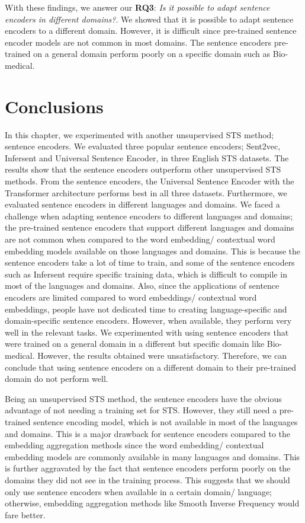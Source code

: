 With these findings, we answer our \textbf{RQ3}: \textit{Is it possible to adapt sentence encoders in different domains?}. We showed that it is possible to adapt sentence encoders to a different domain. However, it is difficult since pre-trained sentence encoder models are not common in most domains. The sentence encoders pre-trained on a general domain perform poorly on a specific domain such as Bio-medical. 

\section{Conclusions}
\label{sec:sentence_conclusions}
In this chapter, we experimented with another unsupervised STS method; sentence encoders. We evaluated three popular sentence encoders; Sent2vec, Infersent and Universal Sentence Encoder, in three English STS datasets. The results show that the sentence encoders outperform other unsupervised STS methods. From the sentence encoders, the Universal Sentence Encoder with the Transformer architecture performs best in all three datasets. Furthermore, we evaluated sentence encoders in different languages and domains. We faced a challenge when adapting sentence encoders to different languages and domains; the pre-trained sentence encoders that support different languages and domains are not common when compared to the word embedding/ contextual word embedding models available on those languages and domains. This is because the sentence encoders take a lot of time to train, and some of the sentence encoders such as Infersent require specific training data, which is difficult to compile in most of the languages and domains. Also, since the applications of sentence encoders are limited compared to word embeddings/ contextual word embeddings, people have not dedicated time to creating language-specific and domain-specific sentence encoders. However, when available, they perform very well in the relevant tasks. We experimented with using sentence encoders that were trained on a general domain in a different but specific domain like Bio-medical. However, the results obtained were unsatisfactory. Therefore, we can conclude that using sentence encoders on a different domain to their pre-trained domain do not perform well.


Being an unsupervised STS method, the sentence encoders have the obvious advantage of not needing a training set for STS. However, they still need a pre-trained sentence encoding model, which is not available in most of the languages and domains. This is a major drawback for sentence encoders compared to the embedding aggregation methods since the word embedding/ contextual embedding models are commonly available in many languages and domains. This is further aggravated by the fact that sentence encoders perform poorly on the domains they did not see in the training process. This suggests that we should only use sentence encoders when available in a certain domain/ language; otherwise, embedding aggregation methods like Smooth Inverse Frequency would fare better. 


